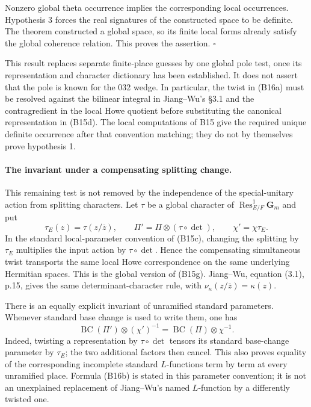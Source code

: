 Nonzero global theta occurrence implies the corresponding local occurrences. Hypothesis 3 forces the real signatures of the constructed space to be definite. The theorem constructed a global space, so its finite local forms already satisfy the global coherence relation. This proves the assertion. \hfill$\square$

This result replaces separate finite-place guesses by one global pole test, once its representation and character dictionary has been established. It does not assert that the pole is known for the 032 wedge. In particular, the twist in (B16a) must be resolved against the bilinear integral in Jiang--Wu's \S3.1 and the contragredient in the local Howe quotient before substituting the canonical representation in (B15d). The local computations of B15 give the required unique definite occurrence after that convention matching; they do not by themselves prove hypothesis 1.

\paragraph{The invariant under a compensating splitting change.}
This remaining test is not removed by the independence of the special-unitary action from splitting characters. Let $\tau$ be a global character of $\operatorname{Res}^{1}_{E/F}\mathbf G_m$ and put
\[
 \tau_E(z)=\tau(z/\overline z),\qquad
 \Pi'=\Pi\otimes(\tau\circ\det),\qquad
 \chi'=\chi\tau_E.
\]
In the standard local-parameter convention of (B15c), changing the splitting by $\tau_E$ multiplies the input action by $\tau\circ\det$. Hence the compensating simultaneous twist transports the same local Howe correspondence on the same underlying Hermitian spaces. This is the global version of (B15g). Jiang--Wu, equation (3.1), p.15, gives the same determinant-character rule, with $\nu_\kappa(z/\bar z)=\kappa(z)$.

There is an equally explicit invariant of unramified standard parameters. Whenever standard base change is used to write them, one has
\[
 \operatorname{BC}(\Pi')\otimes(\chi')^{-1}
   =\operatorname{BC}(\Pi)\otimes\chi^{-1}.
 \tag{B16b}
\]
Indeed, twisting a representation by $\tau\circ\det$ tensors its standard base-change parameter by $\tau_E$; the two additional factors then cancel. This also proves equality of the corresponding incomplete standard $L$-functions term by term at every unramified place. Formula (B16b) is stated in this parameter convention; it is not an unexplained replacement of Jiang--Wu's named $L$-function by a differently twisted one.

